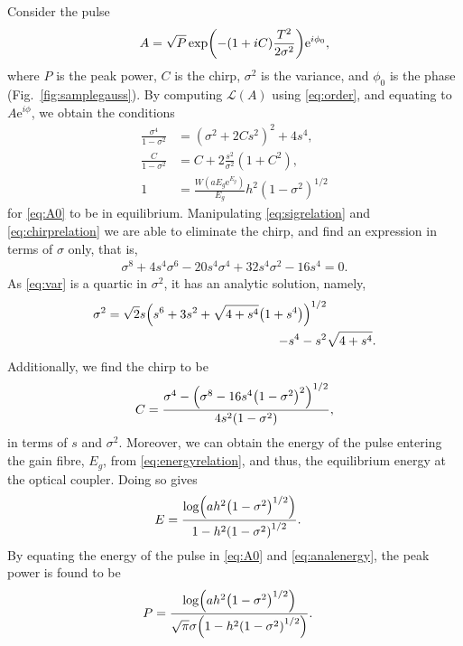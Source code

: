 \documentclass[9pt,twocolumn,twoside]{osajnl}
\let\originalleft\left
\let\originalright\right
\renewcommand{\left}{\mathopen{}\mathclose\bgroup\originalleft}
\renewcommand{\right}{\aftergroup\egroup\originalright}
\begin{document}
Consider the pulse
\begin{align}
	A = \sqrt{P} \exp \left( -(1 + iC) \frac{T^2}{2 \sigma^2} \right) \textrm{e}^{i \phi_0},
	\label{eq:A0}
\end{align}
where $P$ is the peak power, $C$ is the chirp, $\sigma^2$ is the variance, and $\phi_0$ is the phase (Fig.~\ref{fig:samplegauss}). By computing $\mathcal{L}(A)$ using \eqref{eq:order}, and equating to $A \textrm{e}^{i \phi}$, we obtain the conditions
\begin{align}
	\frac{\sigma^4}{1 - \sigma^2} &= (\sigma^2 + 2 C s^2)^2 + 4 s^4, \label{eq:sigrelation} \\
	\frac{C}{1 - \sigma^2} &= C + 2 \frac{s^2}{\sigma^2} (1 + C^2), \label{eq:chirprelation} \\
	1 &= \frac{W(a E_g \textrm{e}^{E_g})}{E_g} h^2 (1 - \sigma^2)^{1/2} \label{eq:energyrelation}
\end{align}
for \eqref{eq:A0} to be in equilibrium. Manipulating \eqref{eq:sigrelation} and \eqref{eq:chirprelation} we are able to eliminate the chirp, and find an expression in terms of $\sigma$ only, that is,
\begin{align}
	\sigma^8 + 4 s^4 \sigma^6 - 20 s^4 \sigma^4 + 32 s^4 \sigma^2 - 16 s^4 = 0. \label{eq:var}
\end{align}
As \eqref{eq:var} is a quartic in $\sigma^2$, it has an analytic solution, namely,
\begin{equation}
	\begin{split}
		\sigma^2 = \sqrt{2} s \left( s^6 + 3s^2 + \sqrt{4 + s^4} \left( 1 + s^4 \right) \right)^{1/2} & \\
		- s^4 - s^2 & \sqrt{4 + s^4}.
		\label{eq:equilvar}
	\end{split}
\end{equation}
Additionally, we find the chirp to be
\begin{align}
	C = \frac{\sigma^4 - \left( \sigma^8 - 16 s^4 \left( 1 - \sigma^2 \right)^2 \right)^{1/2}}{4 s^2 \left( 1 - \sigma^2 \right)},
	\label{eq:chirp}
\end{align}
in terms of $s$ and $\sigma^2$. Moreover, we can obtain the energy of the pulse entering the gain fibre, $E_g$, from \eqref{eq:energyrelation}, and thus, the equilibrium energy at the optical coupler. Doing so gives
\begin{align}
	E &= \frac{\log \left( a h^2 \left( 1 - \sigma^2 \right)^{1/2} \right)}{1 - h^2 \left( 1 - \sigma^2 \right)^{1/2}}.
	\label{eq:analenergy}
\end{align}
By equating the energy of the pulse in \eqref{eq:A0} and \eqref{eq:analenergy}, the peak power is found to be
\begin{align}
	P &= \frac{\log \left( a h^2 \left( 1 - \sigma^2 \right)^{1/2} \right)}{\sqrt{\pi} \sigma \left( 1 - h^2 \left( 1 - \sigma^2 \right)^{1/2} \right)}.
	\label{eq:analpower}
\end{align}
\end{document}
